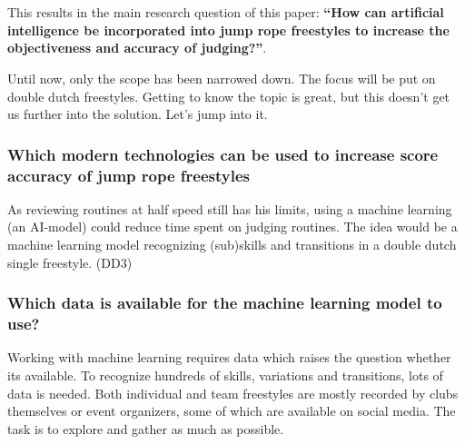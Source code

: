 

\section{}%
\label{sec:onderzoeksvraag}

This results in the main research question of this paper: \textbf{``How can artificial intelligence be incorporated into jump rope freestyles to increase the objectiveness and accuracy of judging?''}.

Until now, only the scope has been narrowed down. The focus will be put on double dutch freestyles. Getting to know the topic is great, but this doesn't get us further into the solution. Let's jump into it.

\subsubsection{Which modern technologies can be used to increase score accuracy of jump rope freestyles}
\label{subsubsec:intro-question-integration}

As reviewing routines at half speed still has his limits, using a machine learning (an AI-model) could reduce time spent on judging routines. The idea would be a machine learning model recognizing (sub)skills and transitions in a double dutch single freestyle. (DD3)

\subsubsection{Which data is available for the machine learning model to use?}
\label{subsubsec:intro-question-data}

Working with machine learning requires data which raises the question whether its available. To recognize hundreds of skills, variations and transitions, lots of data is needed. Both individual and team freestyles are mostly recorded by clubs themselves or event organizers, some of which are available on social media. The task is to explore and gather as much as possible.

